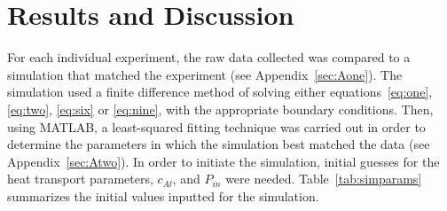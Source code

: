 \documentclass[10pt,aps,prb,twocolumn, nofootinbib]{revtex4-1}
\begin{document}
\section{\label{sec:three}Results and Discussion}
\setcounter{subsubsection}{0}
\renewcommand*{\theHsubsubsection}{chX.\the\value{subsubsection}} %

For each individual experiment, the raw data collected was compared to a simulation that matched the experiment (see Appendix~\ref{sec:Aone}). The simulation used a finite difference method of solving either equations~\ref{eq:one}, \ref{eq:two}, \ref{eq:six} or \ref{eq:nine}, with the appropriate boundary conditions. Then, using MATLAB, a least-squared fitting technique was carried out in order to determine the parameters in which the simulation best matched the data (see Appendix~\ref{sec:Atwo}). In order to initiate the simulation, initial guesses for the heat transport parameters, $c_{Al}$, and $P_{in}$ were needed. Table~\ref{tab:simparams} summarizes the initial values inputted for the simulation.

\begin{table}[hb]
    \caption{\label{tab:simparams}Simulation parameter values.}
    \centering
    \end{table}
\end{document}
